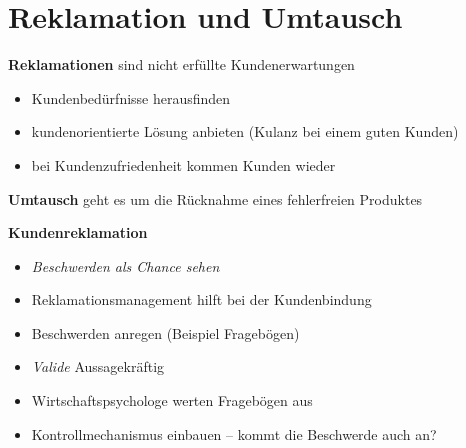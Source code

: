 \section{Reklamation und Umtausch}\label{reklamation-und-umtausch}

\textbf{Reklamationen} sind nicht erfüllte Kundenerwartungen

\begin{itemize}
\item
  Kundenbedürfnisse herausfinden
\item
  kundenorientierte Lösung anbieten (Kulanz bei einem guten Kunden)
\item
  bei Kundenzufriedenheit kommen Kunden wieder
\end{itemize}

\textbf{Umtausch} geht es um die Rücknahme eines fehlerfreien Produktes

\textbf{Kundenreklamation}

\begin{itemize}
\item
  \emph{Beschwerden als Chance sehen}
\item
  Reklamationsmanagement hilft bei der Kundenbindung
\item
  Beschwerden anregen (Beispiel Fragebögen)
\item
  \emph{Valide} Aussagekräftig
\item
  Wirtschaftspsychologe werten Fragebögen aus
\item
  Kontrollmechanismus einbauen -- kommt die Beschwerde auch an?
\end{itemize}
